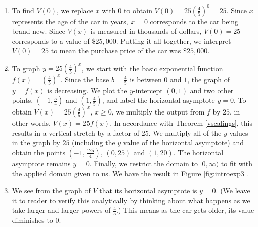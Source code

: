 {
\begin{enumerate}

\item  To find $V(0)$, we replace $x$ with $0$ to obtain $V(0) = 25\left(\frac{4}{5}\right)^{0} = 25$.  Since $x$ represents the age of the car in years, $x=0$ corresponds to the car being brand new.  Since $V(x)$ is measured in thousands of dollars, $V(0)=25$ corresponds to a value of $\$ 25,\!000$.  Putting it all together, we interpret $V(0)=25$ to mean the purchase price of the car was $\$25,\!000$.

\item  To graph $y=25\left(\frac{4}{5}\right)^{x}$,  we start with the basic exponential function $f(x)=\left(\frac{4}{5}\right)^{x}$.  Since the base $b = \frac{4}{5}$ is between $0$ and $1$, the graph of $y=f(x)$ is decreasing.  We plot the $y$-intercept $(0,1)$ and two other points, $\left(-1, \frac{5}{4}\right)$ and $\left(1, \frac{4}{5}\right)$, and label the horizontal asymptote $y=0$.  To obtain $V(x) = 25\left(\frac{4}{5}\right)^{x}$, $x \geq 0$, we multiply the output from $f$ by $25$, in other words, $V(x) = 25 f(x)$. In accordance with Theorem \ref{vscalings}, this results in a vertical stretch by a factor of $25$.  We multiply all of the $y$ values in the graph by $25$ (including the $y$ value of the horizontal asymptote) and obtain the points $\left(-1,\frac{125}{4}\right)$, $(0,25)$ and $(1,20)$. The horizontal asymptote remains $y=0$. Finally, we restrict the domain to $[0,\infty)$ to fit with the applied domain given to us.  We have the result in Figure \ref{fig:introexp3}.


\item  We see from the graph of $V$ that its horizontal asymptote is $y=0$.  (We leave it to reader to verify this analytically by thinking about what happens as we take larger and larger powers of $\frac{4}{5}$.)  This means as the car gets older, its value diminishes to $0$. 
 
\end{enumerate}
}

